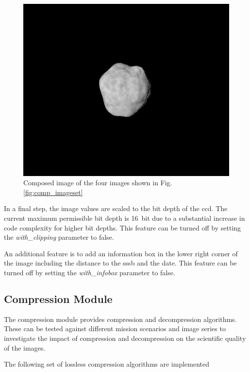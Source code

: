 \begin{figure}
    \centering
    \includegraphics[width=\textwidth]{doc/thesis/0_figures/composition/Comp_2017-08-15T115854-575000.png}
    \caption{Composed image of the four images shown in Fig. \ref{fig:comp_imageset}}
    \label{fig:comp_composed}
\end{figure}

In a final step, the image values are scaled to the bit depth of the \gls{ccd}. The current maximum permissible bit depth is \SI{16}{bit} due to a substantial increase in code complexity for higher bit depths. This feature can be turned off by setting the \textit{with\_clipping} parameter to false.

An additional feature is to add an information box in the lower right corner of the image including the distance to the \gls{sssb} and the date. This feature can be turned off by setting the \textit{with\_infobox} parameter to false.

\subsection{Compression Module}
The compression module provides compression and decompression algorithms. These can be tested against different mission scenarios and image series to investigate the impact of compression and decompression on the scientific quality of the images.

The following set of lossless compression algorithms are implemented

